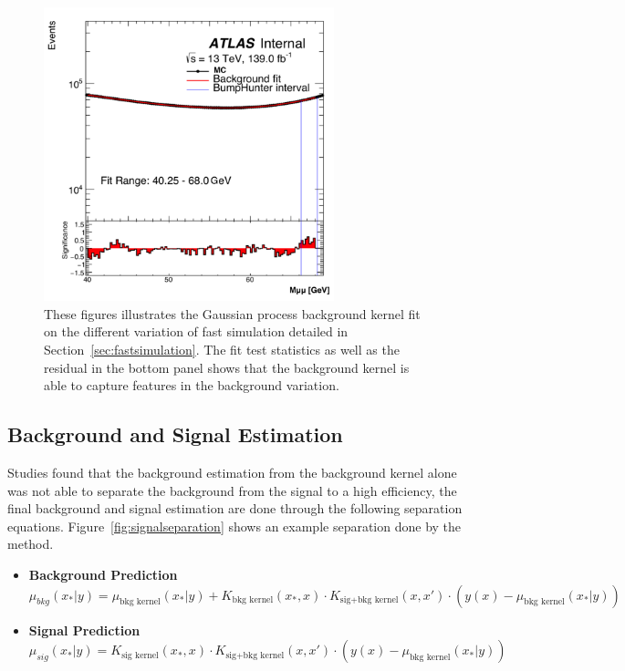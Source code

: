 \begin{figure}[!htb]
\begin{center}
        \includegraphics[width=0.75\textwidth]{figures/chapter_dimuon/eta}        
        \caption{
        These figures illustrates the Gaussian process background kernel fit on the different variation of fast simulation detailed in Section~\ref{sec:fastsimulation}. The fit test statistics as well as the residual in the bottom panel shows that the background kernel is able to capture features in the background variation. 
        }
        \label{fig:dimuonmass}
    \end{center}
\end{figure}

\subsection{Background and Signal Estimation}
Studies found that the background estimation from the background kernel alone was not able to separate the background from the signal to a high efficiency, the final background and signal estimation are done through the following separation equations. Figure~\ref{fig:signalseparation} shows an example separation done by the method.

\begin{itemize}
    \item \textbf{Background Prediction}
    \begin{equation}
        \mu_{bkg}(x_{*}|y) = \mu_{\textrm{bkg kernel}}(x_{*}|y)+K_{\textrm{bkg kernel}}(x_{*}, x) \cdot K_{\textrm{sig+bkg kernel}}(x,x') \cdot( y(x)-\mu_{\textrm{bkg kernel}}(x_{*}|y) )
    \end{equation}


    \item \textbf{Signal Prediction}
    \begin{equation}
        \mu_{sig}(x_{*}|y) = K_{\textrm{sig kernel}}(x_{*}, x)\cdot K_{\textrm{sig+bkg kernel}}(x,x') \cdot ( y(x)-\mu_{\textrm{bkg kernel}}(x_{*}|y) )
    \end{equation}

\end{itemize}

